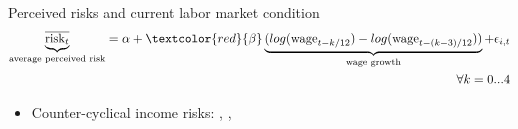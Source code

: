\documentclass{beamer}
\begin{document}



\begin{frame}{Perceived risks and current labor market condition}
	\begin{eqnarray*}
		\underbrace{\overline{\text{risk}_{t}}}_{\text{average perceived risk}} = \alpha + \textcolor{red}{\beta} \underbrace{(log(\text{wage}_{t-k/12}) - log(\text{wage}_{t-(k-3)/12}))}  _{\text{wage growth}}  + \epsilon_{i,t}	 \\
		\quad \forall k =0...4
	\end{eqnarray*}
	
	\begin{table}
		\centering
		\label{macro_corr_he}
	\end{table}
\begin{itemize}
	\item Counter-cyclical income risks: \cite{storesletten2004cyclical}, \cite{guvenen2014nature}, \cite{bayer2019precautionary}
\end{itemize}
\end{frame}
\end{document}
